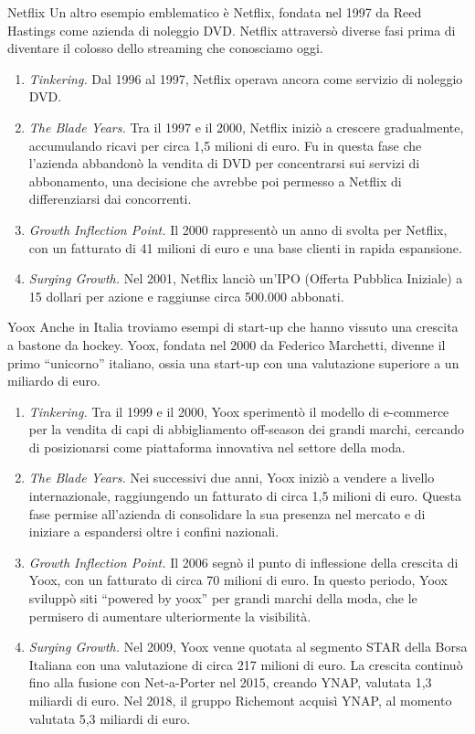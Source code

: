 \begin{Example}{Netflix}{}
Un altro esempio emblematico è Netflix, fondata nel 1997 da Reed Hastings come azienda di noleggio DVD. Netflix attraversò diverse fasi prima di diventare il colosso dello streaming che conosciamo oggi.
\begin{enumerate}
    \item \textit{Tinkering.} Dal 1996 al 1997, Netflix operava ancora come servizio di noleggio DVD.
    \item \textit{The Blade Years.} Tra il 1997 e il 2000, Netflix iniziò a crescere gradualmente, accumulando ricavi per circa 1,5 milioni di euro. Fu in questa fase che l’azienda abbandonò la vendita di DVD per concentrarsi sui servizi di abbonamento, una decisione che avrebbe poi permesso a Netflix di differenziarsi dai concorrenti.
    \item \textit{Growth Inflection Point.} Il 2000 rappresentò un anno di svolta per Netflix, con un fatturato di 41 milioni di euro e una base clienti in rapida espansione.
    \item \textit{Surging Growth.} Nel 2001, Netflix lanciò un’IPO (Offerta Pubblica Iniziale) a 15 dollari per azione e raggiunse circa 500.000 abbonati.
\end{enumerate}
\end{Example}

\begin{Example}{Yoox}{}
Anche in Italia troviamo esempi di start-up che hanno vissuto una crescita a bastone da hockey. Yoox, fondata nel 2000 da Federico Marchetti, divenne il primo “unicorno” italiano, ossia una start-up con una valutazione superiore a un miliardo di euro.
\begin{enumerate}
    \item \textit{Tinkering.} Tra il 1999 e il 2000, Yoox sperimentò il modello di e-commerce per la vendita di capi di abbigliamento off-season dei grandi marchi, cercando di posizionarsi come piattaforma innovativa nel settore della moda.
    \item \textit{The Blade Years.} Nei successivi due anni, Yoox iniziò a vendere a livello internazionale, raggiungendo un fatturato di circa 1,5 milioni di euro. Questa fase permise all’azienda di consolidare la sua presenza nel mercato e di iniziare a espandersi oltre i confini nazionali.
    \item \textit{Growth Inflection Point.} Il 2006 segnò il punto di inflessione della crescita di Yoox, con un fatturato di circa 70 milioni di euro. In questo periodo, Yoox sviluppò siti “powered by yoox” per grandi marchi della moda, che le permisero di aumentare ulteriormente la visibilità.
    \item \textit{Surging Growth.} Nel 2009, Yoox venne quotata al segmento STAR della Borsa Italiana con una valutazione di circa 217 milioni di euro. La crescita continuò fino alla fusione con Net-a-Porter nel 2015, creando YNAP, valutata 1,3 miliardi di euro. Nel 2018, il gruppo Richemont acquisì YNAP, al momento valutata 5,3 miliardi di euro.
\end{enumerate}
\end{Example}

